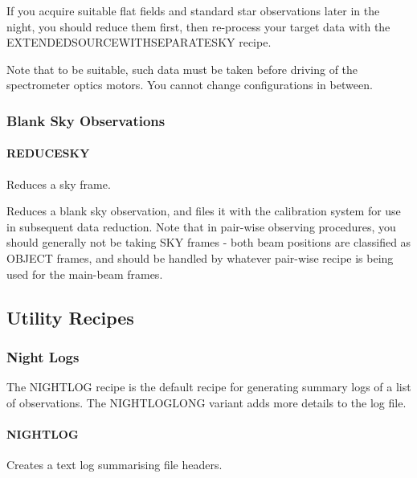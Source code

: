 \documentclass[twoside,11pt]{article}
\renewcommand{\_}{\texttt{\symbol{95}}}
\begin{document}
If you acquire suitable flat fields and standard star observations
later in the night, you should reduce them first, then re-process your
target data with the EXTENDED\_SOURCE\_WITH\_SEPARATE\_SKY recipe.



Note that to be suitable, such data must be taken before driving
of the spectrometer optics motors. You cannot change configurations
in between.


\subsubsection{Blank Sky Observations}

\paragraph{REDUCE\_SKY\label{REDUCE_SKY}}


Reduces a sky frame.


\mbox{}


Reduces a blank sky observation, and files it with the calibration
system for use in subsequent data reduction. Note that in pair-wise
observing procedures, you should generally not be taking SKY frames -
both beam positions are classified as OBJECT frames, and should be
handled by whatever pair-wise recipe is being used for the main-beam
frames.


\subsection{Utility Recipes}

\subsubsection{Night Logs}

The NIGHT\_LOG recipe is the default recipe for generating summary
logs of a list of observations. The NIGHT\_LOG\_LONG variant adds more
details to the log file.

\paragraph{NIGHT\_LOG\label{NIGHT_LOG}}


Creates a text log summarising file headers.


\mbox{}
\end{document}
